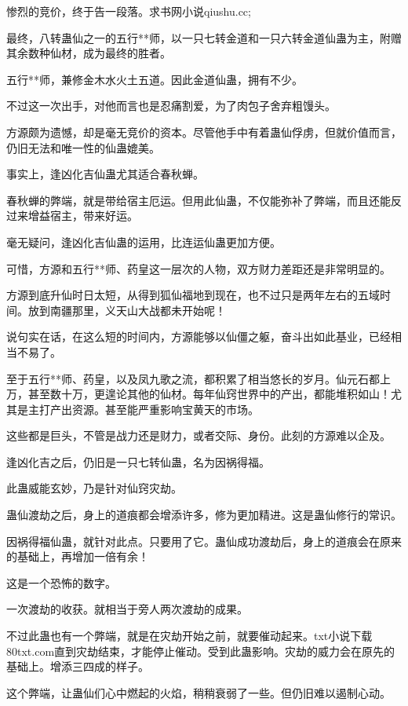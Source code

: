 
\begin{this_body}

惨烈的竞价，终于告一段落。求书网小说qiushu.cc;

最终，八转蛊仙之一的五行**师，以一只七转金道和一只六转金道仙蛊为主，附赠其余数种仙材，成为最终的胜者。

五行**师，兼修金木水火土五道。因此金道仙蛊，拥有不少。

不过这一次出手，对他而言也是忍痛割爱，为了肉包子舍弃粗馒头。

方源颇为遗憾，却是毫无竞价的资本。尽管他手中有着蛊仙俘虏，但就价值而言，仍旧无法和唯一性的仙蛊媲美。

事实上，逢凶化吉仙蛊尤其适合春秋蝉。

春秋蝉的弊端，就是带给宿主厄运。但用此仙蛊，不仅能弥补了弊端，而且还能反过来增益宿主，带来好运。

毫无疑问，逢凶化吉仙蛊的运用，比连运仙蛊更加方便。

可惜，方源和五行**师、药皇这一层次的人物，双方财力差距还是非常明显的。

方源到底升仙时日太短，从得到狐仙福地到现在，也不过只是两年左右的五域时间。放到南疆那里，义天山大战都未开始呢！

说句实在话，在这么短的时间内，方源能够以仙僵之躯，奋斗出如此基业，已经相当不易了。

至于五行**师、药皇，以及凤九歌之流，都积累了相当悠长的岁月。仙元石都上万，甚至数十万，更遑论其他的仙材。每年仙窍世界中的产出，都能堆积如山！尤其是主打产出资源。甚至能严重影响宝黄天的市场。

这些都是巨头，不管是战力还是财力，或者交际、身份。此刻的方源难以企及。

逢凶化吉之后，仍旧是一只七转仙蛊，名为因祸得福。

此蛊威能玄妙，乃是针对仙窍灾劫。

蛊仙渡劫之后，身上的道痕都会增添许多，修为更加精进。这是蛊仙修行的常识。

因祸得福仙蛊，就针对此点。只要用了它。蛊仙成功渡劫后，身上的道痕会在原来的基础上，再增加一倍有余！

这是一个恐怖的数字。

一次渡劫的收获。就相当于旁人两次渡劫的成果。

不过此蛊也有一个弊端，就是在灾劫开始之前，就要催动起来。txt小说下载80txt.com直到灾劫结束，才能停止催动。受到此蛊影响。灾劫的威力会在原先的基础上。增添三四成的样子。

这个弊端，让蛊仙们心中燃起的火焰，稍稍衰弱了一些。但仍旧难以遏制心动。


\end{this_body}
